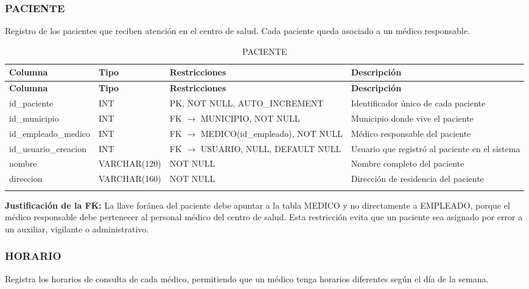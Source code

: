 \documentclass[12pt,a4paper]{article}
\begin{document}
\subsubsection{PACIENTE}
Registro de los pacientes que reciben atenci\'on en el centro de salud. Cada paciente queda asociado a un m\'edico responsable.

{\small\begin{longtable}{|p{2.3cm}|p{3.3cm}|p{4.2cm}|p{4.2cm}|}
\hline
\textbf{Columna} & \textbf{Tipo} & \textbf{Restricciones} & \textbf{Descripci\'on} \\ \hline
\endfirsthead
\hline
\textbf{Columna} & \textbf{Tipo} & \textbf{Restricciones} & \textbf{Descripci\'on} \\ \hline
\endhead
id\_paciente & INT & PK, NOT NULL, AUTO\_INCREMENT & Identificador \'unico de cada paciente \\ \hline
id\_municipio & INT & FK $\rightarrow$ MUNICIPIO, NOT NULL & Municipio donde vive el paciente \\ \hline
id\_empleado\_medico & INT & FK $\rightarrow$ MEDICO(id\_empleado), NOT NULL & M\'edico responsable del paciente \\ \hline
id\_usuario\_creacion & INT & FK $\rightarrow$ USUARIO, NULL, DEFAULT NULL & Usuario que registr\'o al paciente en el sistema \\ \hline
nombre & VARCHAR(120) & NOT NULL & Nombre completo del paciente \\ \hline
direccion & VARCHAR(160) & NOT NULL & Direcci\'on de residencia del paciente \\ \hline
\caption{PACIENTE}
\end{longtable}}

\textbf{Justificaci\'on de la FK:} La llave for\'anea del paciente debe apuntar a la tabla MEDICO y no directamente a EMPLEADO, porque el m\'edico responsable debe pertenecer al personal m\'edico del centro de salud. Esta restricci\'on evita que un paciente sea asignado por error a un auxiliar, vigilante o administrativo.

\subsubsection{HORARIO}
Registra los horarios de consulta de cada m\'edico, permitiendo que un m\'edico tenga horarios diferentes seg\'un el d\'ia de la semana.
\end{document}
